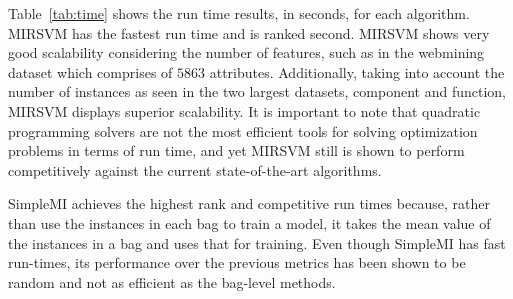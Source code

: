 \documentclass[preprint,12pt]{elsarticle}
\begin{document}
\begin{table}[t!]
{}\vspace{-1.2em}
\label{fig:BonfDunnpmeta}
\end{table}
Table~\ref{tab:time} shows the run time results, in seconds, for each algorithm. MIRSVM has the fastest run time and is ranked second. MIRSVM shows very good scalability considering the number of features, such as in the webmining dataset which comprises of $5863$ attributes. Additionally, taking into account the number of instances as seen in the two largest datasets, component and function, MIRSVM displays superior scalability. It is important to note that quadratic programming solvers are not the most efficient tools for solving optimization problems in terms of run time, and yet MIRSVM still is shown to perform competitively against the current state-of-the-art algorithms. 

SimpleMI achieves the highest rank and competitive run times because, rather than use the instances in each bag to train a model, it takes the mean value of the instances in a bag and uses that for training. Even though SimpleMI has fast run-times, its performance over the previous metrics has been shown to be random and not as efficient as the bag-level methods.
\end{document}
